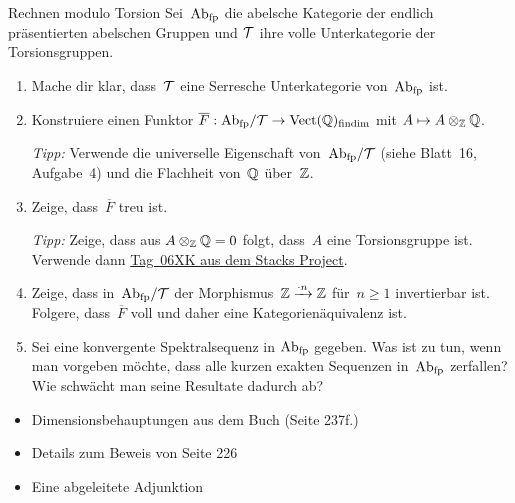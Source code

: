 \documentclass{uebblatt}
\begin{document}

\begin{aufgabe}{Rechnen modulo Torsion}
Sei~$\mathrm{Ab}_\text{fp}$ die abelsche Kategorie der endlich präsentierten abelschen
Gruppen und $\mathcal{T}$ ihre volle Unterkategorie der Torsionsgruppen.
\begin{enumerate}
\item Mache dir klar, dass~$\mathcal{T}$ eine Serresche Unterkategorie
von~$\mathrm{Ab}_\text{fp}$ ist.
\item Konstruiere einen Funktor $\overline{F} : \mathrm{Ab}_\text{fp}/\mathcal{T} \to
\mathrm{Vect}(\mathbb{Q})_\text{findim}$ mit $A \mapsto A \otimes_{\mathbb{Z}} \mathbb{Q}$.

{\tiny\emph{Tipp:} Verwende die universelle Eigenschaft von~$\mathrm{Ab}_\text{fp}/\mathcal{T}$
(siehe Blatt~16, Aufgabe~4) und die Flachheit von~$\mathbb{Q}$ über~$\mathbb{Z}$.\par}

\item Zeige, dass~$\overline{F}$ treu ist.

{\tiny\emph{Tipp:} Zeige, dass aus $A \otimes_{\mathbb{Z}} \mathbb{Q} = 0$ folgt,
dass~$A$ eine Torsionsgruppe ist. Verwende dann
\href{http://stacks.math.columbia.edu/tag/06XK}{Tag~06XK aus dem Stacks
Project}.\par}
\item Zeige, dass in~$\mathrm{Ab}_\text{fp}/\mathcal{T}$ der Morphismus~$\mathbb{Z} \xrightarrow{\cdot
n} \mathbb{Z}$ für~$n \geq 1$ invertierbar ist. Folgere, dass~$\overline{F}$
voll und daher eine Kategorienäquivalenz ist.
\item Sei eine konvergente Spektralsequenz in $\mathrm{Ab}_\text{fp}$ gegeben. Was ist
zu tun, wenn man vorgeben möchte, dass alle kurzen exakten Sequenzen
in~$\mathrm{Ab}_\text{fp}$ zerfallen? Wie schwächt man seine Resultate dadurch ab?
\end{enumerate}
\end{aufgabe}

\begin{itemize}
\item Dimensionsbehauptungen aus dem Buch (Seite 237f.)
\item Details zum Beweis von Seite 226
\item Eine abgeleitete Adjunktion
\end{itemize}
\end{document}
